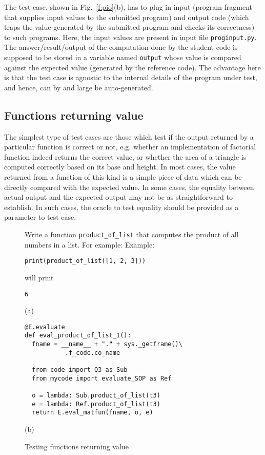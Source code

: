 \documentclass[sigconf]{acmart}
\begin{document}
The test case, shown in Fig.~\ref{f:pio}(b), has to plug in input (program fragment that supplies input values to the submitted program) and output code (which traps the value generated by the submitted program and checks its correctness) to such programs. Here, the input values are present in input file \texttt{proginput.py}. The answer/result/output of the computation done by the student code is supposed to be stored in a variable named \lstinline[style=pc]|output| whose value is compared against the expected value (generated by the reference code). The advantage here is that the test case is agnostic to the internal details of the program under test, and hence, can by and large be auto-generated.


\subsection{Functions returning value}
The simplest type of test cases are those which test if the output returned by a particular function is correct or not, e.g. whether an implementation of factorial function indeed returns the correct value, or whether the area of a triangle is computed correctly based on its base and height. In most cases, the value returned from a function of this kind is a simple piece of data which can be directly compared with the expected value. In some cases, the equality between actual output and the expected output may not be as straightforward to establish. In such cases, the oracle to test equality should be provided as a parameter to test case.

\begin{figure}
\begin{mdframed}[frametitle=Example]
Write a function \lstinline[style=pc]@product_of_list@ that computes the product of all numbers in a list. For example:
Example:
\begin{lstlisting}[style=pc]
print(product_of_list([1, 2, 3]))
\end{lstlisting}
will print
\begin{lstlisting}[style=oc]
6
\end{lstlisting}
\end{mdframed}

(a)

\begin{lstlisting}[style=pc]
@E.evaluate
def eval_product_of_list_1():
  fname = __name__ + "." + sys._getframe()\
           .f_code.co_name

  from code import Q3 as Sub
  from mycode import evaluate_SOP as Ref

  o = lambda: Sub.product_of_list(t3)
  e = lambda: Ref.product_of_list(t3)
  return E.eval_matfun(fname, o, e)
\end{lstlisting}

(b)
\caption{Testing functions returning value}
\label{f:frv}
\end{figure}
\end{document}
